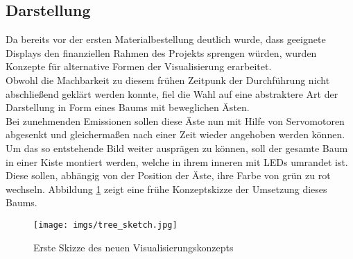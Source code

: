 \documentclass[.../Dokumentation.tex]{subfiles}
\begin{document}
\subsection{Darstellung}\label{sec-ita1-visualization}
Da bereits vor der ersten Materialbestellung deutlich wurde, 
dass geeignete Displays den finanziellen Rahmen des Projekts sprengen 
würden, wurden Konzepte für alternative Formen der Visualisierung erarbeitet.\\
Obwohl die Machbarkeit zu diesem frühen Zeitpunk der Durchführung nicht 
abschließend geklärt werden konnte, fiel die Wahl auf eine abstraktere Art 
der Darstellung in Form eines Baums mit beweglichen Ästen.\\
Bei zunehmenden Emissionen sollen diese Äste nun mit Hilfe von 
Servomotoren abgesenkt und gleichermaßen nach einer Zeit wieder 
angehoben werden können. Um das so entstehende Bild weiter ausprägen zu können, 
soll der gesamte Baum in einer Kiste montiert werden, welche in ihrem inneren 
mit LEDs umrandet ist. Diese sollen, abhängig von der Position der Äste, 
ihre Farbe von grün zu rot wechseln.
Abbildung \ref{fig-tree-sketch} zeigt eine frühe Konzeptskizze der Umsetzung 
dieses Baums.
\begin{figure}[H]
    \begin{center}
    \texttt{[image: imgs/tree\_sketch.jpg]}
    \caption{Erste Skizze des neuen Visualisierungskonzepts}
    \label{fig-tree-sketch}
    \end{center}
\end{figure}
\end{document}
